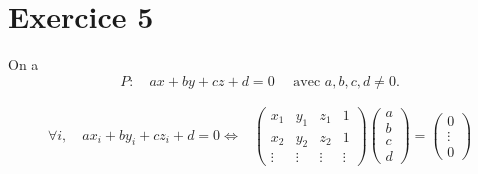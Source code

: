 \part{Exercice 5}

On a \[
	P : \quad ax + by + cz + d = 0 \quad \text{ avec } a, b, c, d \neq 0
.\]

\begin{align*}
	\forall i, \quad ax_i + by_i + cz_i + d = 0 \iff& \begin{pmatrix}
		x_1&y_1&z_1&1\\
		x_2&y_2&z_2&1\\
		\vdots&\vdots&\vdots&\vdots
	\end{pmatrix} \begin{pmatrix}
		a\\b\\c\\d
	\end{pmatrix} = \begin{pmatrix}
		0\\\vdots\\0
	\end{pmatrix}
\end{align*}

